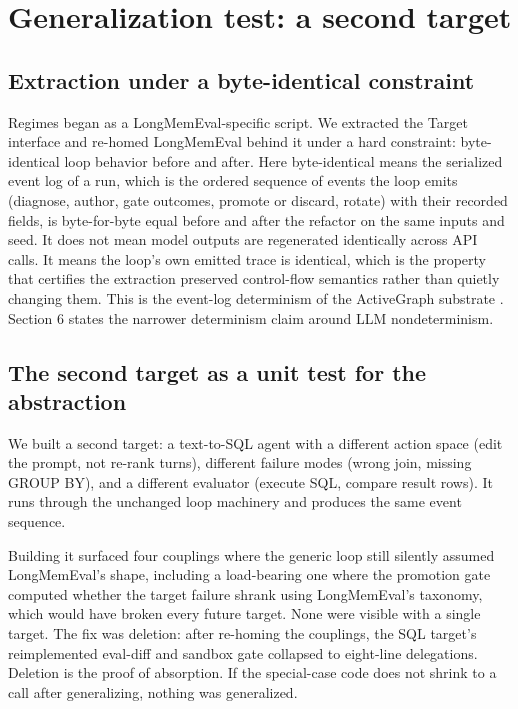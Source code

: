 \section{Generalization test: a second target}

\subsection{Extraction under a byte-identical constraint}

Regimes began as a LongMemEval-specific script. We extracted the Target interface and re-homed LongMemEval behind it under a hard constraint: byte-identical loop behavior before and after. Here byte-identical means the serialized event log of a run, which is the ordered sequence of events the loop emits (diagnose, author, gate outcomes, promote or discard, rotate) with their recorded fields, is byte-for-byte equal before and after the refactor on the same inputs and seed. It does not mean model outputs are regenerated identically across API calls. It means the loop's own emitted trace is identical, which is the property that certifies the extraction preserved control-flow semantics rather than quietly changing them. This is the event-log determinism of the ActiveGraph substrate \citep{nakajima2026log}. Section 6 states the narrower determinism claim around LLM nondeterminism.

\subsection{The second target as a unit test for the abstraction}

We built a second target: a text-to-SQL agent with a different action space (edit the prompt, not re-rank turns), different failure modes (wrong join, missing GROUP BY), and a different evaluator (execute SQL, compare result rows). It runs through the unchanged loop machinery and produces the same event sequence.

Building it surfaced four couplings where the generic loop still silently assumed LongMemEval's shape, including a load-bearing one where the promotion gate computed whether the target failure shrank using LongMemEval's taxonomy, which would have broken every future target. None were visible with a single target. The fix was deletion: after re-homing the couplings, the SQL target's reimplemented eval-diff and sandbox gate collapsed to eight-line delegations. Deletion is the proof of absorption. If the special-case code does not shrink to a call after generalizing, nothing was generalized.


